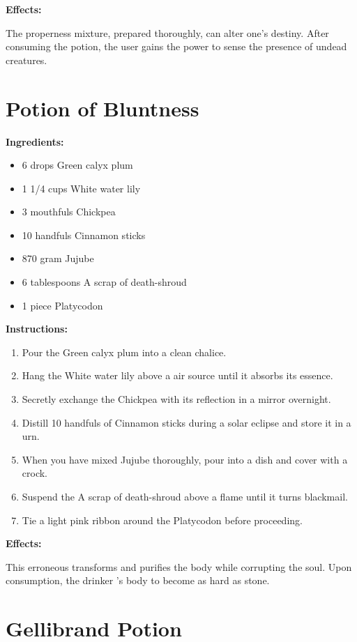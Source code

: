 \documentclass{article}
\begin{document}
\textbf{Effects:}

The properness mixture, prepared thoroughly, can alter one's destiny. After consuming the potion, the user gains the power to sense the presence of undead creatures.

\newpage
\section*{Potion of Bluntness}

\textbf{Ingredients:}

\begin{itemize}
  \item 6 drops Green calyx plum
  \item 1 1/4 cups White water lily
  \item 3 mouthfuls Chickpea
  \item 10 handfuls Cinnamon sticks
  \item 870 gram Jujube
  \item 6 tablespoons A scrap of death-shroud
  \item 1 piece Platycodon
\end{itemize}

\textbf{Instructions:}

\begin{enumerate}
  \item Pour the Green calyx plum into a clean chalice.
  \item Hang the White water lily above a air source until it absorbs its essence.
  \item Secretly exchange the Chickpea with its reflection in a mirror overnight.
  \item Distill 10 handfuls of Cinnamon sticks during a solar eclipse and store it in a urn.
  \item When you have mixed Jujube thoroughly, pour into a dish and cover with a crock.
  \item Suspend the A scrap of death-shroud above a flame until it turns blackmail.
  \item Tie a light pink ribbon around the Platycodon before proceeding.
\end{enumerate}

\textbf{Effects:}

This erroneous transforms and purifies the body while corrupting the soul. Upon consumption, the drinker 's body to become as hard as stone.

\newpage
\section*{Gellibrand Potion}
\end{document}
